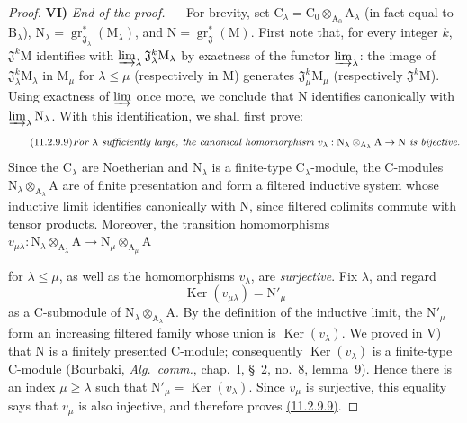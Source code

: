\begin{proof}
\medskip
\noindent\textbf{VI)} \emph{End of the proof.} --- For brevity, set $\mathrm{C}_\lambda=\mathrm{C}_0\otimes_{\mathrm{A}_0}\mathrm{A}_\lambda$ (in fact equal to $\mathrm{B}_\lambda$), $\mathrm{N}_\lambda=\operatorname{gr}^*_{\mathfrak{J}_\lambda}(\mathrm{M}_\lambda)$, and $\mathrm{N}=\operatorname{gr}^*_\mathfrak{J}(\mathrm{M})$. First note that, for every integer $k$, $\mathfrak{J}^k\mathrm{M}$ identifies with $\varinjlim_\lambda\mathfrak{J}_\lambda^k\mathrm{M}_\lambda$ by exactness of the functor $\varinjlim_\lambda$: the image of $\mathfrak{J}_\lambda^k\mathrm{M}_\lambda$ in $\mathrm{M}_\mu$ for $\lambda\leqslant\mu$ (respectively in $\mathrm{M}$) generates $\mathfrak{J}_\mu^k\mathrm{M}_\mu$ (respectively $\mathfrak{J}^k\mathrm{M}$). Using exactness of $\varinjlim$ once more, we conclude that $\mathrm{N}$ identifies canonically with $\varinjlim_\lambda\mathrm{N}_\lambda$. With this identification, we shall first prove:
\begin{equation}
\label{IV.11.2.9.9}
\tag{11.2.9.9}
\text{\emph{For $\lambda$ sufficiently large, the canonical homomorphism $v_\lambda:\mathrm{N}_\lambda\otimes_{\mathrm{A}_\lambda}\mathrm{A}\to\mathrm{N}$ is bijective.}}
\end{equation}
Since the $\mathrm{C}_\lambda$ are Noetherian and $\mathrm{N}_\lambda$ is a finite-type $\mathrm{C}_\lambda$-module, the $\mathrm{C}$-modules $\mathrm{N}_\lambda\otimes_{\mathrm{A}_\lambda}\mathrm{A}$ are of finite presentation and form a filtered inductive system whose inductive limit identifies canonically with $\mathrm{N}$, since filtered colimits commute with tensor products. Moreover, the transition homomorphisms $v_{\mu\lambda}:\mathrm{N}_\lambda\otimes_{\mathrm{A}_\lambda}\mathrm{A}\to\mathrm{N}_\mu\otimes_{\mathrm{A}_\mu}\mathrm{A}$


for $\lambda\leqslant\mu$, as well as the homomorphisms $v_\lambda$, are
\emph{surjective}. Fix $\lambda$, and regard
\[
  \operatorname{Ker}(v_{\mu\lambda})=\mathrm{N}'_\mu
\]
as a $\mathrm{C}$-submodule of
$\mathrm{N}_\lambda\otimes_{\mathrm{A}_\lambda}\mathrm{A}$. By the
definition of the inductive limit, the $\mathrm{N}'_\mu$ form an
increasing filtered family whose union is $\operatorname{Ker}(v_\lambda)$.
We proved in V) that $\mathrm{N}$ is a finitely presented
$\mathrm{C}$-module; consequently
$\operatorname{Ker}(v_\lambda)$ is a finite-type $\mathrm{C}$-module
(Bourbaki, \emph{Alg.\ comm.}, chap.~I, \S~2, no.~8, lemma~9). Hence
there is an index $\mu\geqslant\lambda$ such that
$\mathrm{N}'_\mu=\operatorname{Ker}(v_\lambda)$. Since $v_\mu$ is
surjective, this equality says that $v_\mu$ is also injective, and
therefore proves {\hyperref[IV.11.2.9]{(11.2.9.9)}}.


\end{proof}
